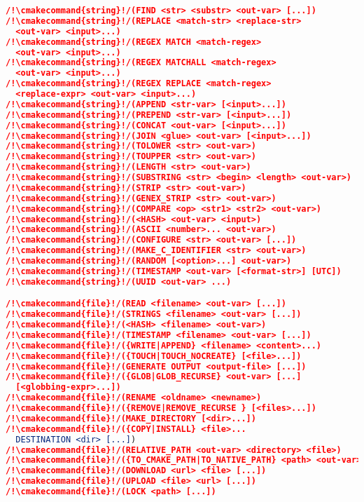 \documentclass{article}
\newcommand{\cmakecommand}[1]{{\href{https://cmake.org/cmake/help/v3.13/command/#1.html}{#1}}}
\begin{document}
\begin{minipage}[t]{0.18\linewidth}
\begin{lstlisting}[language=CMake]
/!\cmakecommand{string}!/(FIND <str> <substr> <out-var> [...])
/!\cmakecommand{string}!/(REPLACE <match-str> <replace-str>
  <out-var> <input>...)
/!\cmakecommand{string}!/(REGEX MATCH <match-regex>
  <out-var> <input>...)
/!\cmakecommand{string}!/(REGEX MATCHALL <match-regex>
  <out-var> <input>...)
/!\cmakecommand{string}!/(REGEX REPLACE <match-regex>
  <replace-expr> <out-var> <input>...)
/!\cmakecommand{string}!/(APPEND <str-var> [<input>...])
/!\cmakecommand{string}!/(PREPEND <str-var> [<input>...])
/!\cmakecommand{string}!/(CONCAT <out-var> [<input>...])
/!\cmakecommand{string}!/(JOIN <glue> <out-var> [<input>...])
/!\cmakecommand{string}!/(TOLOWER <str> <out-var>)
/!\cmakecommand{string}!/(TOUPPER <str> <out-var>)
/!\cmakecommand{string}!/(LENGTH <str> <out-var>)
/!\cmakecommand{string}!/(SUBSTRING <str> <begin> <length> <out-var>)
/!\cmakecommand{string}!/(STRIP <str> <out-var>)
/!\cmakecommand{string}!/(GENEX_STRIP <str> <out-var>)
/!\cmakecommand{string}!/(COMPARE <op> <str1> <str2> <out-var>)
/!\cmakecommand{string}!/(<HASH> <out-var> <input>)
/!\cmakecommand{string}!/(ASCII <number>... <out-var>)
/!\cmakecommand{string}!/(CONFIGURE <str> <out-var> [...])
/!\cmakecommand{string}!/(MAKE_C_IDENTIFIER <str> <out-var>)
/!\cmakecommand{string}!/(RANDOM [<option>...] <out-var>)
/!\cmakecommand{string}!/(TIMESTAMP <out-var> [<format-str>] [UTC])
/!\cmakecommand{string}!/(UUID <out-var> ...)

/!\cmakecommand{file}!/(READ <filename> <out-var> [...])
/!\cmakecommand{file}!/(STRINGS <filename> <out-var> [...])
/!\cmakecommand{file}!/(<HASH> <filename> <out-var>)
/!\cmakecommand{file}!/(TIMESTAMP <filename> <out-var> [...])
/!\cmakecommand{file}!/({WRITE|APPEND} <filename> <content>...)
/!\cmakecommand{file}!/({TOUCH|TOUCH_NOCREATE} [<file>...])
/!\cmakecommand{file}!/(GENERATE OUTPUT <output-file> [...])
/!\cmakecommand{file}!/({GLOB|GLOB_RECURSE} <out-var> [...]
  [<globbing-expr>...])
/!\cmakecommand{file}!/(RENAME <oldname> <newname>)
/!\cmakecommand{file}!/({REMOVE|REMOVE_RECURSE } [<files>...])
/!\cmakecommand{file}!/(MAKE_DIRECTORY [<dir>...])
/!\cmakecommand{file}!/({COPY|INSTALL} <file>...
  DESTINATION <dir> [...])
/!\cmakecommand{file}!/(RELATIVE_PATH <out-var> <directory> <file>)
/!\cmakecommand{file}!/({TO_CMAKE_PATH|TO_NATIVE_PATH} <path> <out-var>)
/!\cmakecommand{file}!/(DOWNLOAD <url> <file> [...])
/!\cmakecommand{file}!/(UPLOAD <file> <url> [...])
/!\cmakecommand{file}!/(LOCK <path> [...])
\end{lstlisting}

\end{minipage}
\end{document}
